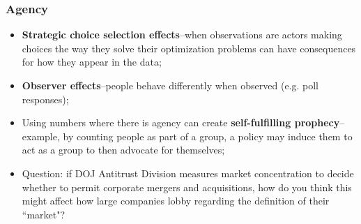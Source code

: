 \documentclass[aspectratio=169]{beamer}
\theoremstyle{principle}
\begin{document}
\begin{frame}
\frametitle{Agency}
\begin{itemize}
\item \textbf{Strategic choice selection effects}--when observations are actors making choices the way they solve their optimization problems can have consequences for how they appear in the data;
\bigskip
\bigskip
\item \textbf{Observer effects}–people behave differently when observed (e.g. poll responses);
\bigskip
\bigskip
\item Using numbers where there is agency can create \textbf{self-fulfilling prophecy}--example, by counting people as part of a group, a policy may induce them to act as a group to then advocate for themselves;
\bigskip
\bigskip
\item Question: if DOJ Antitrust Division measures market concentration to decide whether to permit corporate mergers and acquisitions, how do you think this might affect how large companies lobby regarding the definition of their ``market"?
\end{itemize}
\end{frame}
\end{document}
